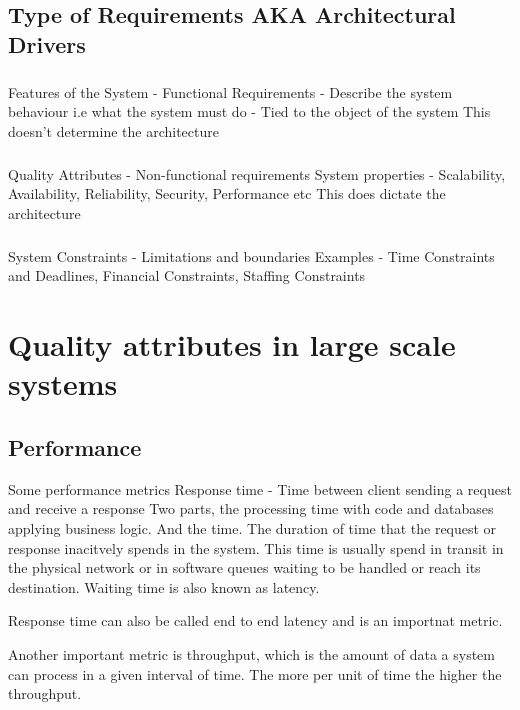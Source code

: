 \documentclass[a4paper, 11pt]{book}
\begin{document}
    \section{Type of Requirements AKA Architectural Drivers}

    \paragraph{}
    Features of the System - Functional Requirements - Describe the system behaviour i.e what the system must do - Tied to the object of the system
    This doesn't determine the architecture

    \paragraph{}
    Quality Attributes - Non-functional requirements
    System properties - Scalability, Availability, Reliability, Security, Performance etc
    This does dictate the architecture

    \paragraph{}
    System Constraints - Limitations and boundaries
    Examples - Time Constraints and Deadlines, Financial Constraints, Staffing Constraints


    \chapter{Quality attributes in large scale systems}


    \section{Performance}
    Some performance metrics
    Response time - Time between client sending a request and receive a response
    Two parts, the processing time with code and databases applying business logic.
    And the  time.
    The duration of time that the request or response inacitvely spends in the system.
    This time is usually spend in transit in the physical network or in software queues waiting to be handled or reach its destination.
    Waiting time is also known as latency.

    Response time can also be called end to end latency and is an importnat metric.

    Another important metric is throughput, which is the amount of data a system can process in a given interval of time.
    The more per unit of time the higher the throughput.
\end{document}
